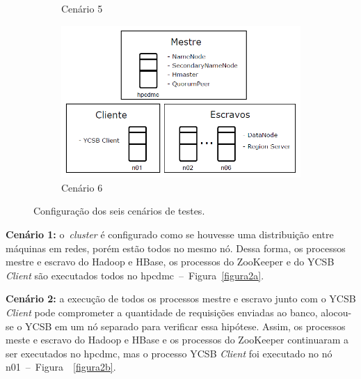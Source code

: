\documentclass[12pt]{article}
\begin{document}
\begin{figure}
\begin{subfigure}{0.3\textwidth}
        \caption{Cenário 5}
        \label{figura2e}
    \end{subfigure}
    \begin{subfigure}{0.35\textwidth}   
    	\centering
        \includegraphics[width=1.0\textwidth]{images/cenario-6.png}
        \caption{Cenário 6}%
        \label{figura2f}
    \end{subfigure}
    \caption{Configuração dos seis cenários de testes.}
\end{figure}

\textbf{Cenário 1:} o~\emph{cluster} é configurado como se houvesse uma distribuição entre máquinas em redes, porém estão todos no mesmo nó. 
Dessa forma, os processos mestre e escravo do Hadoop e HBase, os processos do ZooKeeper e do YCSB \emph{Client} são executados todos no hpcdmc~--~Figura~\ref{figura2a}.

\textbf{Cenário 2:} a execução de todos os processos mestre e escravo junto com o YCSB \emph{Client} pode comprometer a quantidade de requisições enviadas ao banco, alocou-se o YCSB em um nó separado para verificar essa hipótese. 
Assim, os processos meste e escravo do Hadoop e HBase e os processos do ZooKeeper continuaram a ser executados no hpcdmc, mas o processo YCSB \emph{Client} foi executado no nó n01~--~Figura~~\ref{figura2b}.
\end{document}
